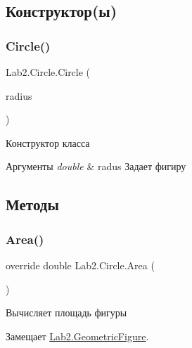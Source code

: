 \subsection{Конструктор(ы)}
\mbox{\label{class_lab2_1_1_circle_ac95d3e44e178cf6199237fc74698465c}} 
\subsubsection{\texorpdfstring{Circle()}{Circle()}}
{\footnotesize\ttfamily Lab2.\+Circle.\+Circle (\begin{DoxyParamCaption}\item[{double}]{radius }\end{DoxyParamCaption})}

Конструктор класса 
\begin{DoxyParams}{Аргументы}
{\em double} & radus Задает фигиру \\
\hline
\end{DoxyParams}


\subsection{Методы}
\mbox{\label{class_lab2_1_1_circle_afe38ef7cc9ce4b02a6e640d3029e5962}} 
\subsubsection{\texorpdfstring{Area()}{Area()}}
{\footnotesize\ttfamily override double Lab2.\+Circle.\+Area (\begin{DoxyParamCaption}{ }\end{DoxyParamCaption})\hspace{0.3cm}{\ttfamily [virtual]}}

Вычисляет площадь фигуры 

Замещает \hyperlink{class_lab2_1_1_geometric_figure_aeb0853b133cedd1d23f5d8a1d73af8a8}{Lab2.\+Geometric\+Figure}.

\mbox{\label{class_lab2_1_1_circle_a300cdfbc89e35dadfdcd35ff085ffc13}} 
